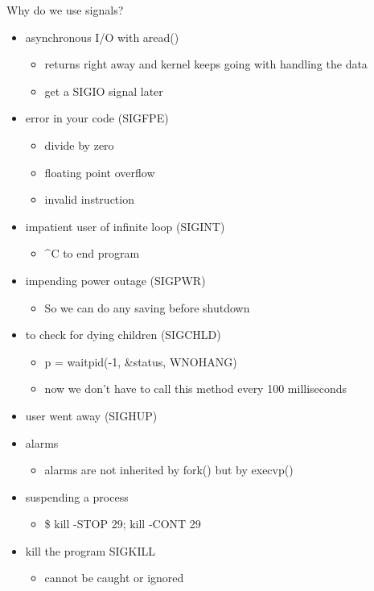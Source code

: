 \documentclass[../../lecture_notes.tex]{subfiles}
\begin{document}
Why do we use signals?
\begin{itemize} 
\item asynchronous I/O with aread() 
	\begin{itemize} [nosep]
	\item returns right away and kernel keeps going with handling the data
	\item get a SIGIO signal later
	\end{itemize}
\item error in your code (SIGFPE)
	\begin{itemize} [nosep]
	\item divide by zero
	\item floating point overflow
	\item invalid instruction
	\end{itemize}
\item impatient user of infinite loop (SIGINT)
	\begin{itemize} [nosep]
	\item \^{}C to end program
    	\end{itemize}
\item impending power outage (SIGPWR)
	\begin{itemize} [nosep]
	\item So we can do any saving before shutdown
    	\end{itemize}
\item to check for dying children (SIGCHLD)
	\begin{itemize} [nosep]
	\item p = waitpid(-1, \&status, WNOHANG)
	\item now we don't have to call this method every 100 milliseconds
    	\end{itemize}
\item user went away (SIGHUP)
\item alarms
	\begin{itemize} [nosep]
	\item alarms are not inherited by fork() but by execvp()
    	\end{itemize}
\item suspending a process
	\begin{itemize} [nosep]
	\item \$ kill -STOP 29; kill -CONT 29
    	\end{itemize}
\item kill the program SIGKILL
	\begin{itemize} [nosep]
	\item cannot be caught or ignored
    	\end{itemize}
\end{itemize}
\end{document}
